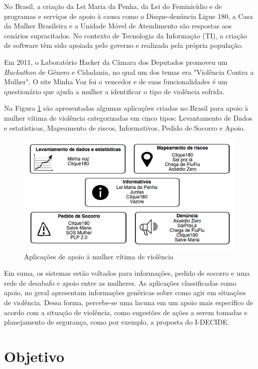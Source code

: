 No Brasil, a criação da Lei Maria da Penha, da Lei do Feminicídio e de programas e serviços de apoio à causa 
como o Disque-denúncia Ligue 180, a Casa da Mulher Brasileira e a Unidade Móvel de Atendimento são respostas aos cenários supracitados. No contexto de Tecnologia da Informação (TI), a criação de software têm sido apoiada pelo governo e realizada pela própria população.

Em 2011, o Laboratório Hacker da Câmara dos Deputados promoveu um \textit{Hackathon} de Gênero e Cidadania, no qual
um dos temas era "Violência Contra a Mulher". O site Minha Voz foi o vencedor e de suas funcionalidades é um questionário que ajuda a mulher a identificar o tipo de violência sofrida. 

Na Figura \ref{fig:sistemas_categorizados} são apresentadas algumas aplicações criadas no Brasil para apoio à mulher vítima de violência categorizadas em cinco tipos: Levantamento de Dados e estatísticas, Mapeamento de riscos, Informativos, Pedido de Socorro e Apoio.

\begin{figure}[ht]
\centering
\includegraphics[scale=0.85]{figuras/sistemas_relacionados.png}
\caption{Aplicações de apoio à mulher vítima de violência}
\label{fig:sistemas_categorizados}
\end{figure}

Em suma, os sistemas estão voltados para informações, pedido de socorro e uma rede de desabafo e apoio entre as mulheres. 
As aplicações classificadas como apoio, no geral apresentam informações genéricas sobre como agir em situações de violência. Dessa forma, percebe-se uma lacuna em um apoio mais específico de acordo com a situação de violência, como sugestões de ações a serem tomadas e planejamento de segurança, como por exemplo, a proposta do I-DECIDE.

\section{Objetivo}


